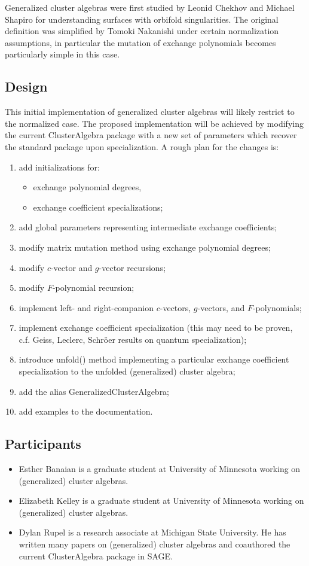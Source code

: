 \documentclass{amsart}
\begin{document}
  Generalized cluster algebras were first studied by Leonid Chekhov and Michael Shapiro for understanding surfaces with orbifold singularities.
  The original definition was simplified by Tomoki Nakanishi under certain normalization assumptions, in particular the mutation of exchange polynomials becomes particularly simple in this case.

  \subsection*{Design}
  This initial implementation of generalized cluster algebras will likely restrict to the normalized case.
  The proposed implementation will be achieved by modifying the current ClusterAlgebra package with a new set of parameters which recover the standard package upon specialization.
  A rough plan for the changes is:
  \begin{enumerate}
    \item add initializations for:
      \begin{itemize}
        \item exchange polynomial degrees,
        \item exchange coefficient specializations;
      \end{itemize}
    \item add global parameters representing intermediate exchange coefficients;
    \item modify matrix mutation method using exchange polynomial degrees;
    \item modify $c$-vector and $g$-vector recursions;
    \item modify $F$-polynomial recursion;
    \item implement left- and right-companion $c$-vectors, $g$-vectors, and $F$-polynomials;
    \item implement exchange coefficient specialization (this may need to be proven, c.f. Geiss, Leclerc, Schr\"oer results on quantum specialization);
    \item introduce unfold() method implementing a particular exchange coefficient specialization to the unfolded (generalized) cluster algebra;
    \item add the alias GeneralizedClusterAlgebra;
    \item add examples to the documentation.
  \end{enumerate}

  \subsection*{Participants}
  \begin{itemize}
    \item Esther Banaian is a graduate student at University of Minnesota working on (generalized) cluster algebras.
    \item Elizabeth Kelley is a graduate student at University of Minnesota working on (generalized) cluster algebras.
    \item Dylan Rupel is a research associate at Michigan State University.
      He has written many papers on (generalized) cluster algebras and coauthored the current ClusterAlgebra package in SAGE.
  \end{itemize}
\end{document}
